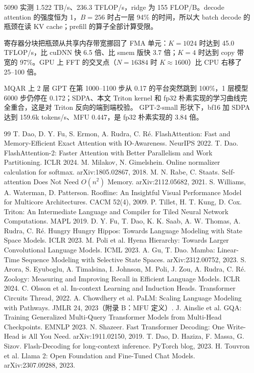 \documentclass[11pt,a4paper]{ctexart}
\begin{document}
\begin{findingbox}[：Roofline]
5090 实测 1.522 TB/s、236.3 TFLOP/s，ridge 为 155 FLOP/B。decode attention 的强度恒为 1，$B=256$ 时占一层 94\% 的时间，所以大 batch decode 的瓶颈在读 KV cache；prefill 的算子全部计算受限。
\end{findingbox}

\begin{findingbox}[：卷积]
寄存器分块把瓶颈从共享内存带宽挪回了 FMA 单元：$K=1024$ 时达到 45.0 TFLOP/s，比 cuDNN 快 6.5 倍、比 smem 版快 3.7 倍；$K=4$ 时达到 copy 带宽的 97\%。GPU 上 FFT 的交叉点（$N=16384$ 时 $K\approx1600$）比 CPU 右移了 25–100 倍。
\end{findingbox}

\begin{findingbox}[：训练]
MQAR 上 2 层 GPT 在第 1000–1100 步从 0.17 的平台突然跳到 100\%，1 层模型 6000 步仍停在 0.172；SDPA、本文 Triton kernel 和 fp32 朴素实现的学习曲线完全重合，这是对 Triton 反向的端到端校验。
GPT-2-small 形状下，bf16 加 SDPA 达到 159.6k tokens/s、MFU 0.447，是 fp32 朴素实现的 3.84 倍。
\end{findingbox}

\begin{thebibliography}{99}
 T. Dao, D. Y. Fu, S. Ermon, A. Rudra, C. Ré. FlashAttention: Fast and Memory-Efficient Exact Attention with IO-Awareness. NeurIPS 2022.
 T. Dao. FlashAttention-2: Faster Attention with Better Parallelism and Work Partitioning. ICLR 2024.
 M. Milakov, N. Gimelshein. Online normalizer calculation for softmax. arXiv:1805.02867, 2018.
 M. N. Rabe, C. Staats. Self-attention Does Not Need $O(n^2)$ Memory. arXiv:2112.05682, 2021.
 S. Williams, A. Waterman, D. Patterson. Roofline: An Insightful Visual Performance Model for Multicore Architectures. CACM 52(4), 2009.
 P. Tillet, H. T. Kung, D. Cox. Triton: An Intermediate Language and Compiler for Tiled Neural Network Computations. MAPL 2019.
 D. Y. Fu, T. Dao, K. K. Saab, A. W. Thomas, A. Rudra, C. Ré. Hungry Hungry Hippos: Towards Language Modeling with State Space Models. ICLR 2023.
 M. Poli et al. Hyena Hierarchy: Towards Larger Convolutional Language Models. ICML 2023.
 A. Gu, T. Dao. Mamba: Linear-Time Sequence Modeling with Selective State Spaces. arXiv:2312.00752, 2023.
 S. Arora, S. Eyuboglu, A. Timalsina, I. Johnson, M. Poli, J. Zou, A. Rudra, C. Ré. Zoology: Measuring and Improving Recall in Efficient Language Models. ICLR 2024.
 C. Olsson et al. In-context Learning and Induction Heads. Transformer Circuits Thread, 2022.
 A. Chowdhery et al. PaLM: Scaling Language Modeling with Pathways. JMLR 24, 2023（附录 B：MFU 定义）.
 J. Ainslie et al. GQA: Training Generalized Multi-Query Transformer Models from Multi-Head Checkpoints. EMNLP 2023.
 N. Shazeer. Fast Transformer Decoding: One Write-Head is All You Need. arXiv:1911.02150, 2019.
 T. Dao, D. Haziza, F. Massa, G. Sizov. Flash-Decoding for long-context inference. PyTorch blog, 2023.
 H. Touvron et al. Llama 2: Open Foundation and Fine-Tuned Chat Models. arXiv:2307.09288, 2023.
\end{thebibliography}
\end{document}
